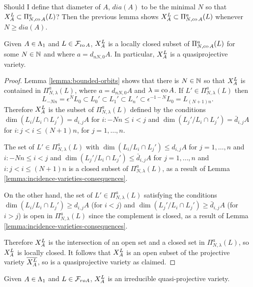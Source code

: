 \documentclass[a4paper, 11pt]{report}
\begin{document}
{\color{gray}Should I define that diameter of $A$, $dia(A)$ to be the minimal $N$ so that $\xprod[L]{A}\subset\Pi_{N,\co{A}}^a(L)$? Then the previous lemma shows $\xprod[L]{A}\subset\Pi_{N,\co{A}}^a(L)$ whenever $N\geq dia(A)$.}

\begin{lemma}\label{lemma:orbits-are-quasiprojective}
Given $A\in\matrices$ and $L\in\flags_{\ro{A}}$, $\xprod[L]{A}$ is a locally closed subset of $\Pi_{N,\co{A}}^a(L)$ for some $N\in\naturals$ and where $a=d_{nN,0}{A}$. In particular, $\xprod[L]{A}$ is a quasiprojective variety.
\end{lemma}

\begin{proof}
Lemma \ref{lemma:bounded-orbits} shows that there is $N\in\naturals$ so that $\xprod[L]{A}$ is contained in $\Pi_{N,\lambda}^a(L)$, where $a=d_{nN,0}{A}$ and $\lambda=\co{A}$. If $L'\in\Pi_{N,\lambda}^a(L)$ then
\begin{equation*}
L_{-Nn}=\epsilon^N L_0\subset L_0'\subset L_1'\subset L_n'\subset \epsilon^{-1-N}L_0 = L_{(N+1)n}.
\end{equation*}
Therefore $\xprod[L]{A}$ is the subset of $\Pi_{N,\lambda}^a(L)$ defined by the conditions $\dim(L_i/{L_i\cap L_j'})=d_{i,j}{A}$ for $i:-Nn\le i<j$ and $\dim(L_j'/{L_i\cap L_j'})=\bar{d}_{i,j}{A}$ for $i:j<i\le(N+1)n$, for $j=1,\ldots,n$.

The set of $L'\in\Pi_{N,\lambda}^a(L)$ with $\dim(L_i/{L_i\cap L_j'})\le d_{i,j}{A}$ for $j=1,\ldots,n$ and $i:-Nn\le i<j$ and $\dim(L_j'/{L_i\cap L_j'})\le\bar{d}_{i,j}{A}$ for $j=1,\ldots,n$ and $i:j<i\le(N+1)n$ is a closed subset of $\Pi_{N,\lambda}^a(L)$, as a result of Lemma \ref{lemma:incidence-varieties-consequences}.

On the other hand, the set of $L'\in\Pi_{N,\lambda}^a(L)$ satisfying the conditions $\dim(L_i/{L_i\cap L_j'})\geq d_{i,j}{A}$ (for $i<j$) and $\dim(L_j'/{L_i\cap L_j'})\geq\bar{d}_{i,j}{A}$ (for $i>j$) is open in $\Pi_{N,\lambda}^a(L)$ since the complement is closed, as a result of Lemma \ref{lemma:incidence-varieties-consequences}.

Therefore $\xprod[L]{A}$ is the intersection of an open set and a closed set in $\Pi_{N,\lambda}^a(L)$, so $\xprod[L]{A}$ is locally closed. It follows that $\xprod[L]{A}$ is an open subset of the projective variety $\overline{\xprod[L]{A}}$, so is a quasiprojective variety as claimed. 
\end{proof}

\begin{lemma}\label{lemma:orbits-are-irreducible}
Given $A\in\matrices$ and $L\in\flags_{ro{A}}$, $\xprod[L]{A}$ is an irreducible quasi-projective variety.
\end{lemma}
\end{document}
